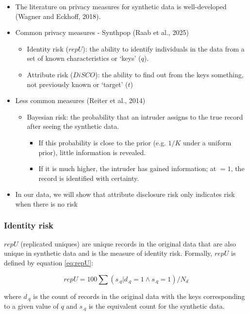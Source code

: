 \documentclass[t,8pt,utfx8]{beamer}
\begin{document}
\begin{spacing}{1.25}
\begin{frame}[t]
\begin{itemize}
    \item The literature on privacy measures for synthetic data is well-developed (Wagner and Eckhoff, 2018).  
    \item Common privacy measures - Synthpop (Raab et al., 2025)
    \begin{itemize}
        \item Identity risk ($repU$): the ability to identify individuals in the data from a set of known characteristics or `keys' ($q$).  
        \item Attribute risk ($DiSCO$): the ability to find out from the keys something, not previously known or `target' ($t$)
    \end{itemize}
    \item Less common measures (Reiter et al., 2014)
    \begin{itemize}
        \item Bayesian risk: the probability that an intruder assigns to the true record after seeing the synthetic data.  
        \begin{itemize}
            \item If this probability is close to the prior (e.g. $1/K$ under a uniform prior), little information is revealed.  
            \item If it is much higher, the intruder has gained information; at $=1$, the record is identified with certainty.  
        \end{itemize}
    \end{itemize}
    \item In our data, we will show that attribute disclosure risk only indicates risk when there is no risk
\end{itemize}
\end{frame}

\begin{frame}[t]\frametitle{Identity risk}

$repU$ (replicated uniques) are unique records in the original data that are also unique in synthetic data and is the measure of identity risk.  Formally, $repU$ is defined by equation \ref{eq:repU}:

\begin{equation}
repU = 100 \sum (s_{.q}|d_{.q} = 1 \land s_{.q} = 1 )/N_{d}
\label{eq:repU}
\end{equation}

where $d_{.q}$ is the count of records in the original data with the keys corresponding to a given value of $q$ and $s_{.q}$ is the equivalent count for the synthetic data.  


\end{frame}
\end{spacing}
\end{document}
